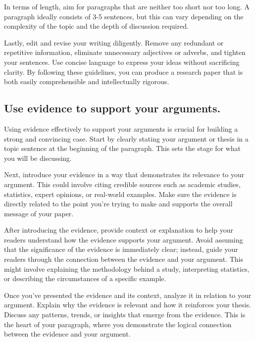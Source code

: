 \documentclass[
  b5paper]{book}
\begin{document}
In terms of length, aim for paragraphs that are neither too short nor too long. A paragraph ideally consists of 3-5 sentences, but this can vary depending on the complexity of the topic and the depth of discussion required.

Lastly, edit and revise your writing diligently. Remove any redundant or repetitive information, eliminate unnecessary adjectives or adverbs, and tighten your sentences. Use concise language to express your ideas without sacrificing clarity. By following these guidelines, you can produce a research paper that is both easily comprehensible and intellectually rigorous.

\hypertarget{use-evidence-to-support-your-arguments.}{%
\subsection*{Use evidence to support your arguments.}\label{use-evidence-to-support-your-arguments.}}

Using evidence effectively to support your arguments is crucial for building a strong and convincing case. Start by clearly stating your argument or thesis in a topic sentence at the beginning of the paragraph. This sets the stage for what you will be discussing.

Next, introduce your evidence in a way that demonstrates its relevance to your argument. This could involve citing credible sources such as academic studies, statistics, expert opinions, or real-world examples. Make sure the evidence is directly related to the point you're trying to make and supports the overall message of your paper.

After introducing the evidence, provide context or explanation to help your readers understand how the evidence supports your argument. Avoid assuming that the significance of the evidence is immediately clear; instead, guide your readers through the connection between the evidence and your argument. This might involve explaining the methodology behind a study, interpreting statistics, or describing the circumstances of a specific example.

Once you've presented the evidence and its context, analyze it in relation to your argument. Explain why the evidence is relevant and how it reinforces your thesis. Discuss any patterns, trends, or insights that emerge from the evidence. This is the heart of your paragraph, where you demonstrate the logical connection between the evidence and your argument.
\end{document}
